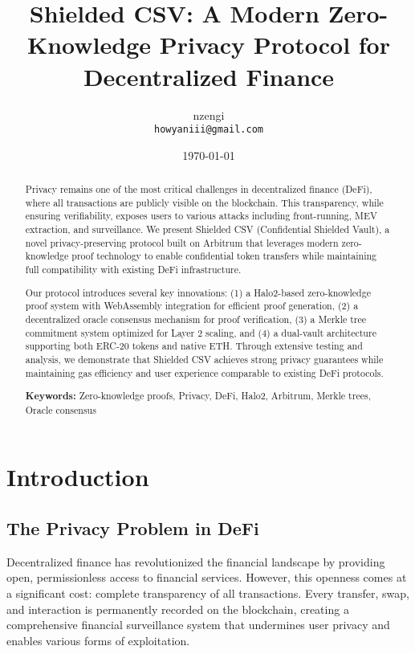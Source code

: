 \documentclass[11pt,a4paper]{article}
\title{\textbf{Shielded CSV: A Modern Zero-Knowledge Privacy Protocol for Decentralized Finance}}
\author{nzengi \\ \texttt{howyaniii@gmail.com}}
\date{\today}
\begin{document}
\maketitle

\begin{abstract}
Privacy remains one of the most critical challenges in decentralized finance (DeFi), where all transactions are publicly visible on the blockchain. This transparency, while ensuring verifiability, exposes users to various attacks including front-running, MEV extraction, and surveillance. We present Shielded CSV (Confidential Shielded Vault), a novel privacy-preserving protocol built on Arbitrum that leverages modern zero-knowledge proof technology to enable confidential token transfers while maintaining full compatibility with existing DeFi infrastructure.

Our protocol introduces several key innovations: (1) a Halo2-based zero-knowledge proof system with WebAssembly integration for efficient proof generation, (2) a decentralized oracle consensus mechanism for proof verification, (3) a Merkle tree commitment system optimized for Layer 2 scaling, and (4) a dual-vault architecture supporting both ERC-20 tokens and native ETH. Through extensive testing and analysis, we demonstrate that Shielded CSV achieves strong privacy guarantees while maintaining gas efficiency and user experience comparable to existing DeFi protocols.

\textbf{Keywords:} Zero-knowledge proofs, Privacy, DeFi, Halo2, Arbitrum, Merkle trees, Oracle consensus
\end{abstract}

\section{Introduction}

\subsection{The Privacy Problem in DeFi}

Decentralized finance has revolutionized the financial landscape by providing open, permissionless access to financial services. However, this openness comes at a significant cost: complete transparency of all transactions. Every transfer, swap, and interaction is permanently recorded on the blockchain, creating a comprehensive financial surveillance system that undermines user privacy and enables various forms of exploitation.
\end{document}
